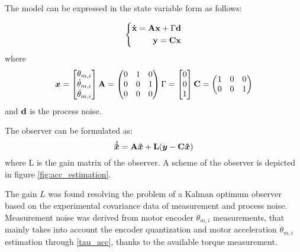 The model can be expressed in the state variable form as follows:
%

\begin{equation}
\left \{
\begin{aligned}
\mathbf{\dot{x}}=\mathbf{A}\mathbf{x} + {\Gamma }\mathbf{d} \\
\mathbf{y}=\mathbf{C}\mathbf{x}
\end{aligned}
\right .
\end{equation}
%
where
%
\begin{equation}
\begin{aligned}
{ \boldsymbol {x}}=\begin{bmatrix}  {\theta_{m,i}} \\ \dot{\theta}_{m,i} \\ \ddot{\theta}_{m,i} \end{bmatrix}
\mathbf{A}=\begin{pmatrix} 0 & 1 & 0  \\
	0 & 0 & 1 \\
	0 & 0 & 0  \end{pmatrix}
{\Gamma }=\begin{bmatrix}  0 \\ 0 \\ 1 \end{bmatrix}
\mathbf{C}=\begin{pmatrix} 1 & 0 & 0  \\
	0 & 0 & 1 \end{pmatrix} 
\end{aligned}
\end{equation}
%
and $\mathbf{d}$ is the process noise.

The observer can be formulated as:
%
\begin{equation}
{ \boldsymbol {\dot{\hat{x}}}}=\mathbf{A}{ \boldsymbol {\hat{x}}}+\mathbf{L}({ \boldsymbol {y}}-\mathbf{C}{ \boldsymbol {\hat{x}}})
\end{equation}
%
where L is the gain matrix of the observer. A scheme of the observer is depicted in figure \ref{fig:acc_estimation}. 
%

The gain $L$ was found resolving the problem of a Kalman optimum observer based on the experimental covariance data of measurement and process noise. Measurement noise was derived from motor encoder ${\theta}_{m,i}$ measurements, that mainly takes into account the encoder quantization and motor acceleration $\ddot{\theta}_{m,i}$ estimation through \eqref{tau_acc}, thanks to the available torque measurement.

